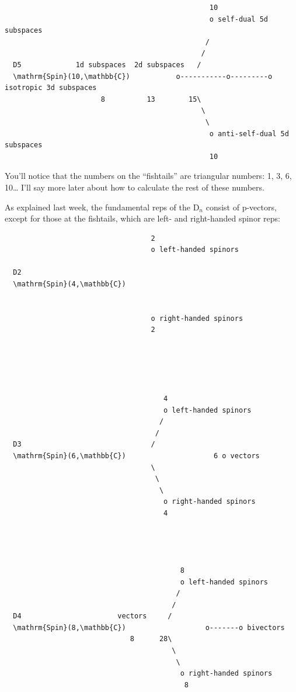 \documentclass{article}
\begin{document}
\begin{itemize}
\begin{verbatim}
                                                 10
                                                 o self-dual 5d subspaces
                                                /            
                                               / 
  D5             1d subspaces  2d subspaces   /
  \mathrm{Spin}(10,\mathbb{C})           o-----------o---------o isotropic 3d subspaces
                       8          13        15\
                                               \
                                                \
                                                 o anti-self-dual 5d subspaces
                                                 10
\end{verbatim}

  You'll notice that the numbers on the ``fishtails'' are triangular
  numbers: 1, 3, 6, 10\ldots{} I'll say more later about how to
  calculate the rest of these numbers.

  As explained last week, the fundamental reps of the \(\mathrm{D}_n\)
  consist of p-vectors, except for those at the fishtails, which are
  left- and right-handed spinor reps:

\begin{verbatim}
                                   2
                                   o left-handed spinors

  D2                                      
  \mathrm{Spin}(4,\mathbb{C})                 


                                   o right-handed spinors
                                   2





                                      4
                                      o left-handed spinors
                                     /
                                    /
  D3                               /
  \mathrm{Spin}(6,\mathbb{C})                     6 o vectors
                                   \
                                    \
                                     \
                                      o right-handed spinors
                                      4




                                          8
                                          o left-handed spinors
                                         /
                                        /
  D4                       vectors     /
  \mathrm{Spin}(8,\mathbb{C})                   o-------o bivectors
                              8      28\
                                        \
                                         \
                                          o right-handed spinors
                                           8





\end{verbatim}
\end{itemize}
\end{document}

